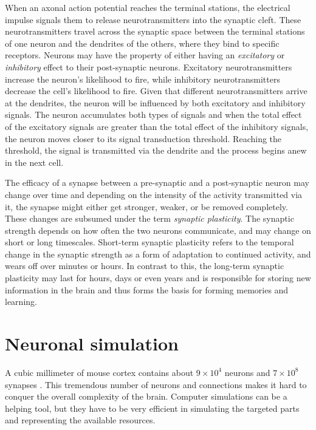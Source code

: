 When an axonal action potential reaches the terminal stations, the electrical impulse signals them to release neurotransmitters into the synaptic cleft. These neurotransmitters travel across the synaptic space between the terminal stations of one neuron and the dendrites of the others, where they bind to specific receptors. Neurons may have the property of either having an \emph{excitatory} or \emph{inhibitory} effect to their post-synaptic neurons. Excitatory neurotransmitters increase the neuron's likelihood to fire, while inhibitory neurotransmitters decrease the cell's likelihood to fire. Given that different neurotransmitters arrive at the dendrites, the neuron will be influenced by both excitatory and inhibitory signals. The neuron accumulates both types of signals and when the total effect of the excitatory signals are greater than the total effect of the inhibitory signals, the neuron moves closer to its signal transduction threshold. Reaching the threshold, the signal is transmitted via the dendrite and the process begins anew in the next cell.

The efficacy of a synapse between a pre-synaptic and a post-synaptic neuron may change over time and depending on the intensity of the activity transmitted via it, the synapse might either get stronger, weaker, or be removed completely. These changes are subsumed under the term \emph{synaptic plasticity}. The synaptic strength depends on how often the two neurons communicate, and may change on short or long timescales. Short-term synaptic plasticity refers to the temporal change in the synaptic strength as a form of adaptation to continued activity, and wears off over minutes or hours. In contrast to this, the long-term synaptic plasticity may last for hours, days or even years and is responsible for storing new information in the brain and thus forms the basis for forming memories and learning.

\section{Neuronal simulation}

A cubic millimeter of mouse cortex contains about $9×10^4$ neurons and $7×10^8$ synapses \citep{faisal2005ion}. This tremendous number of neurons and connections makes it hard to conquer the overall complexity of the brain. Computer simulations can be a helping tool, but they have to be very efficient in simulating the targeted parts and representing the available resources.

